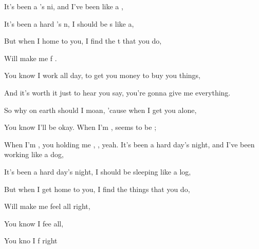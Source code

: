 


\zs

It's been a  's ni, and I've been  like a ,

It's been a hard 's n, I should be s like a,

But when I  home to you, I find the t that you do,

Will make me f .
\ks
\zs

You know I work all day, to get you money to buy you things,

And it's worth it just to hear you say, you're gonna give me everything.

So why on earth should I moan, 'cause when I get you alone,

You know I'll be okay.
\ks
\zr
When I'm ,  seems to be ;

When I'm ,  you holding me , , yeah.
\kr
\zs
It's been a hard day's night, and I've been working like a dog,

It's been a hard day's night, I should be sleeping like a log,

But when I get home to you, I find the things that you do,

Will make me feel all right,

You know I fee all,

You kno I f  right 
\ks
\kp

